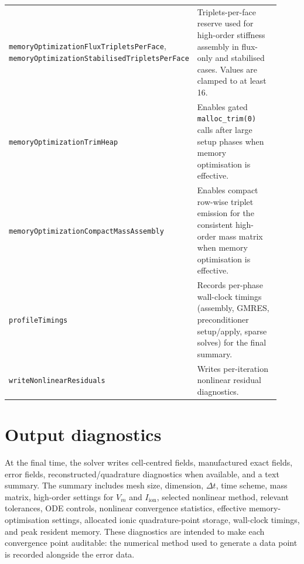 \documentclass[11pt,a4paper]{article}
\newcommand{\code}[1]{\texttt{\small #1}}
\newcommand{\Vm}{V_m}
\newcommand{\Iion}{I_{\mathrm{ion}}}
\begin{document}
\begin{longtable}{@{}p{0.34\linewidth}p{0.58\linewidth}@{}}
\code{memoryOptimizationFluxTripletsPerFace}, \code{memoryOptimizationStabilisedTripletsPerFace} & Triplets-per-face reserve used for high-order stiffness assembly in flux-only and stabilised cases. Values are clamped to at least 16. \\
\code{memoryOptimizationTrimHeap} & Enables gated \code{malloc\_trim(0)} calls after large setup phases when memory optimisation is effective. \\
\code{memoryOptimizationCompactMassAssembly} & Enables compact row-wise triplet emission for the consistent high-order mass matrix when memory optimisation is effective. \\
\code{profileTimings} & Records per-phase wall-clock timings (assembly, GMRES, preconditioner setup/apply, sparse solves) for the final summary. \\
\code{writeNonlinearResiduals} & Writes per-iteration nonlinear residual diagnostics. \\
\bottomrule
\end{longtable}

\section{Output diagnostics}

At the final time, the solver writes cell-centred fields, manufactured exact
fields, error fields, reconstructed/quadrature diagnostics when available, and
a text summary. The summary includes mesh size, dimension, $\Delta t$, time
scheme, mass matrix, high-order settings for $\Vm$ and $\Iion$, selected
nonlinear method, relevant tolerances, ODE controls, nonlinear convergence
statistics, effective memory-optimisation settings, allocated ionic
quadrature-point storage, wall-clock timings, and peak resident memory. These diagnostics are
intended to make each convergence point auditable: the numerical method used to
generate a data point is recorded alongside the error data.
\end{document}

